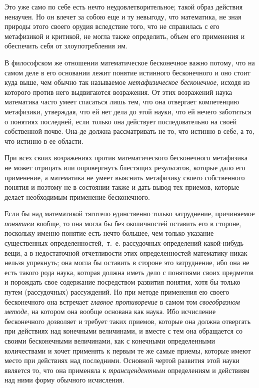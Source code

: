 Это уже само по себе есть нечто неудовлетворительное; такой образ действия
ненаучен. Но он влечет за собою еще и ту невыгоду, что математика, не зная
природы этого своего орудия вследствие того, что не справилась с его
метафизикой и критикой, не могла также определить, объем его применения и
обеспечить себя от злоупотребления им.

В философском же отношении математическое бесконечное важно потому, что на
самом деле в его основании лежит понятие истинного бесконечного и оно стоит
куда выше, чем обычно так называемое
{\em метафизическое бесконечное}, исходя из которого
против него выдвигаются возражения. От этих возражений наука математика
часто умеет спасаться лишь тем, что она отвергает компетенцию метафизики,
утверждая, что ей нет дела до этой науки, что ей нечего заботиться о
понятиях последней, если только она действует последовательно на своей
собственной почве. Она-де должна рассматривать не то, что истинно в себе, а
то, что истинно в ее области.

При всех своих возражениях против математического бесконечного метафизика не
может отрицать или опровергнуть блестящих результатов, которые дало его
применение, а математика не умеет выяснить метафизику своего собственного
понятия и поэтому не в состоянии также и дать вывод тех приемов, которые
делает необходимым применение бесконечного.

Если бы над математикой тяготело единственно только затруднение, причиняемое
{\em понятием} вообще, то она могла бы без околичностей
оставить его в стороне, поскольку именно понятие есть нечто большее, чем
только указание существенных определенностей,~т.~е. рассудочных определений
какой-нибудь вещи, а в недостаточной отчетливости этих определенностей
математику никак нельзя упрекнуть; она могла бы оставить в стороне это
затруднение, ибо она не есть такого рода наука, которая должна иметь дело с
понятиями своих предметов и порождать свое содержание посредством развития
понятия, хотя бы только путем (рассудочных) рассуждений. Но при методе
применения ею своего бесконечного она встречает
{\em главное противоречие} в самом том
{\em своеобразном методе}, на котором она вообще
основана как наука. Ибо исчисление бесконечного дозволяет и требует таких
приемов, которые она должна отвергать при действиях над конечными
величинами, и вместе с тем она обращается со своими бесконечными
величинами, как с конечными определенными количествами и хочет применять к
первым те же самые приемы, которые имеют место при действиях над
последними. Основной чертой развития этой науки является то, что она
применяла к {\em трансцендентным} определениям и
действиям над ними форму обычного исчисления.

